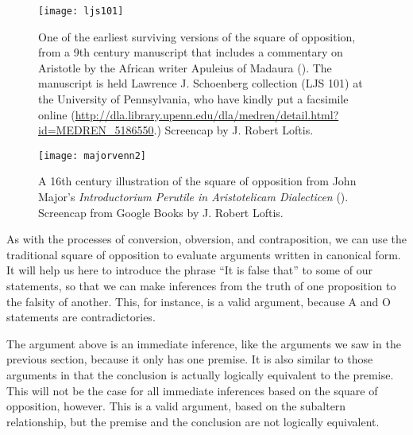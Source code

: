 \begin{figure}
\begin{center}
\texttt{[image: ljs101]}
\end{center}
\caption{One of the earliest surviving versions of the square of opposition, from a 9th century manuscript that includes a commentary on Aristotle by the African writer Apuleius of Madaura (\cite{Apuleius1987}). The manuscript is held Lawrence J. Schoenberg collection (LJS 101) at the University of Pennsylvania, who have kindly put a facsimile online (\url{http://dla.library.upenn.edu/dla/medren/detail.html?id=MEDREN_5186550}.)  Screencap by J. Robert Loftis.}
\label{fig:apuleiussquare}
\end{figure}


\begin{figure}
\begin{center}
\texttt{[image: majorvenn2]}
\end{center}
\caption{A 16th century illustration of the square of opposition from John Major's \textit{Introductorium Perutile in Aristotelicam Dialecticen} (\cite*[fol.L]{Major1527}). Screencap from Google Books by J.  Robert Loftis.}
\label{fig:majorsquare}
\end{figure}

As with the processes of conversion, obversion, and contraposition, we can use the traditional square of opposition to evaluate arguments written in canonical form. It will help us here to introduce the phrase ``It is false that'' to some of our statements, so that we can make inferences from the truth of one proposition to the falsity of another. This, for instance, is a valid argument, because A and O statements are contradictories.


\begin{kormanize}
\end{kormanize}

The argument above is an immediate inference, like the arguments we saw in the previous section, because it only has one premise. It is also similar to those arguments in that the conclusion is actually logically equivalent to the premise. This will not be the case for all immediate inferences based on the square of opposition, however. This is a valid argument, based on the subaltern relationship, but the premise and the conclusion are not logically equivalent.

\begin{kormanize}
\end{kormanize}


